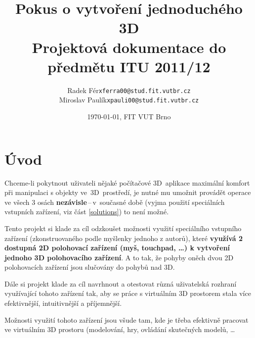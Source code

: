 \documentclass[a4paper,12pt,titlepage]{article}
\begin{document}
\renewcommand{\refname}{Literatura}

\title{\LARGE Pokus o vytvoření jednoduchého 3D  \\
       {\large Projektová dokumentace do předmětu ITU 2011/12}}
\author{ \begin{tabularx}{\textwidth}{X r l X}
& Radek Fér & \texttt{xferra00@stud.fit.vutbr.cz} & \\
& Miroslav Paulík & \texttt{xpauli00@stud.fit.vutbr.cz} & \\
\end{tabularx}
}
\date{\today, FIT VUT Brno}

\maketitle

\newpage

\thispagestyle{empty}
\tableofcontents
\newpage
\setcounter{page}{1}



\section{Úvod}\label{intro}
Chceme-li pokytnout uživateli nějaké počítačové 3D~aplikace maximální
komfort při manipulaci s objekty ve~3D~prostředí, je nutné mu umožnit provádět
operace ve všech 3 osách {\bf nezávisle}\,--\,v~současné době (vyjma použití
speciálních vstupních zařízení, viz část \ref{solutions}) to není možné.


Tento projekt si klade za cíl odzkoušet možnosti využití speciálního
vstupního zařízení (zkonstruovaného podle myšlenky jednoho z autorů),
které {\bf využívá 2 dostupná 2D polohovací zařízení (myš, touchpad, \ldots)
k vytvoření jednoho 3D polohovacího zařízení}. A to tak, že pohyby
oněch dvou 2D polohovacích zařízení jsou slučovány do pohybů nad 3D.

Dále si projekt klade za cíl navrhnout a otestovat různá uživatelská rozhraní
využívající tohoto zařízení tak, aby se práce s virtuálním 3D prostorem
stala více efektivnější, intuitivnější a příjemnější.

Možnosti využití tohoto zařízení jsou všude tam, kde je třeba efektivně
pracovat ve virtuálním 3D prostoru (modelování, hry, ovládání skutečných
modelů, \ldots
\end{document}
